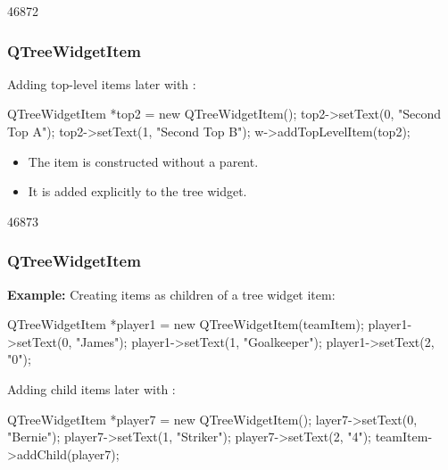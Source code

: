 \begin{slide}[fragile]{46872}\frametitle{QTreeWidgetItem}

\vspace*{0.5em}
Adding top-level items later with :

\vspace*{0.5em}
\begin{cpp}
QTreeWidgetItem *top2 = new QTreeWidgetItem();
top2->setText(0, "Second Top A");
top2->setText(1, "Second Top B");
w->addTopLevelItem(top2);
\end{cpp}

\vspace*{1em}
\begin{itemize}
\item The item is constructed without a parent.
\item It is added explicitly to the tree widget.
\end{itemize}

\vfill
{}
\end{slide}

\begin{slide}[fragile]{46873}\frametitle{QTreeWidgetItem}

\textbf{Example:} Creating items as children of a tree widget item:

\vspace*{0.5em}
\begin{cpp}
QTreeWidgetItem *player1 = new QTreeWidgetItem(teamItem);
player1->setText(0, "James");
player1->setText(1, "Goalkeeper");
player1->setText(2, "0");
\end{cpp}

\vspace*{0.5em}
Adding child items later with :

\vspace*{0.5em}
\begin{cpp}
QTreeWidgetItem *player7 = new QTreeWidgetItem();
layer7->setText(0, "Bernie");
player7->setText(1, "Striker");
player7->setText(2, "4");
teamItem->addChild(player7);
\end{cpp}

\vspace*{1em}


\end{slide}

